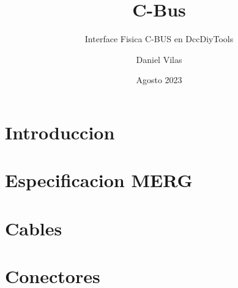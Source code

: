 \documentclass[spanish]{DccDiyTools/DccDiyTools}
\title{C-Bus}
\subtitle{Interface Fisica C-BUS en DccDiyTools}
\author{Daniel Vilas}
\date{Agosto 2023}
\begin{document}
\maketitle
\newpage
\section{Introduccion}

\section{Especificacion MERG}
\section{Cables}
\section{Conectores}

\end{document}
